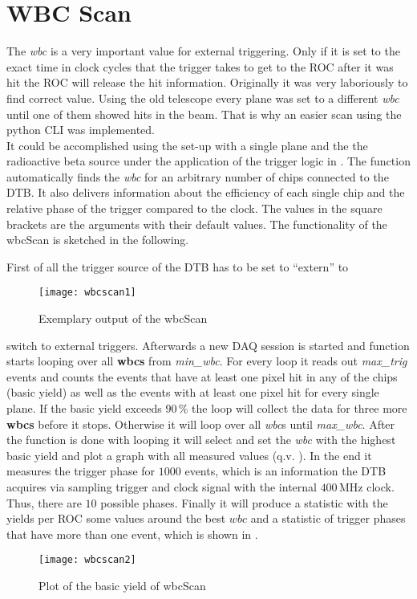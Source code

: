 \section{WBC Scan}
The \textit{wbc} is a very important value for external triggering. Only if it is set to the exact time in clock cycles that the trigger takes to get to the \ac{ROC} after it was hit the \ac{ROC} will release the hit information. Originally it was very laboriously to find correct value. Using the old telescope every plane was set to a different \textit{wbc} until one of them showed hits in the beam. That is why an easier scan using the python \ac{CLI} was implemented.\\
It could be accomplished using the set-up with a single plane and the the radioactive beta source  under the application of the trigger logic in . The function 
automatically finds the \textit{wbc} for an arbitrary number of chips connected to the \ac{DTB}. It also delivers information about the efficiency of each single chip and the relative phase of the trigger compared to the clock. The values in the square brackets are the arguments with their default values. The functionality of the wbcScan is sketched in the following.\par\vspace*{-5pt}
First of all the trigger source of the \ac{DTB} has to be set to ``extern'' to 
\begin{wrapfigure}{l}{5cm}
	\vspace*{-10pt}
	\texttt{[image: wbcscan1]}
	\caption{Exemplary output of the wbcScan}
	\label{pwbc1}
	\vspace*{-5pt}
\end{wrapfigure} switch to external triggers. Afterwards a new \ac{DAQ} session is started and function starts looping over all \textbf{wbcs} from \textit{min\_wbc}. For every loop it reads out \textit{max\_trig} events and counts the events that have at least one pixel hit in any of the chips (basic yield) as well as the events with at least one pixel hit for every single plane. If the basic yield exceeds $90\,$\% the loop will collect the data for three more \textbf{wbcs} before it stops. Otherwise it will loop over all \textit{wbc}s until \textit{max\_wbc}. After the function is done with looping it will select and set the \textit{wbc} with the highest basic yield and plot a graph with all measured values (q.v. ). In the end it measures the trigger phase for $1000$ events, which is an information the \ac{DTB} acquires via sampling trigger and clock signal with the internal $400\,$MHz clock. Thus, there are $10$ possible phases. Finally it will produce a statistic with the yields per \ac{ROC} some values around the best $wbc$ and a statistic of trigger phases that have more than one event, which is shown in .
\begin{figure}[ht]
	\centering
	\texttt{[image: wbcscan2]}
	\caption{Plot of the basic yield of wbcScan}
	\label{pwbc2}
\end{figure}\no
